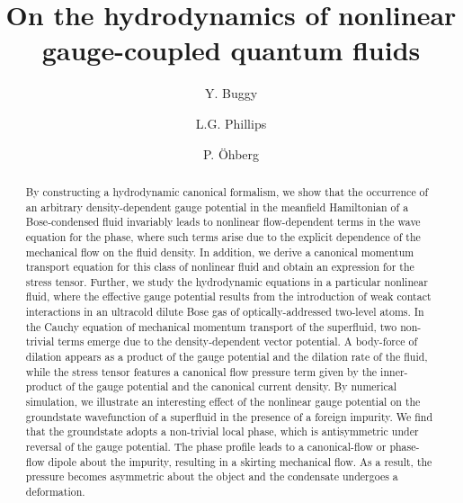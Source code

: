 \documentclass[twocolumn, nofootinbib, nobibnotes, amsmath,amssymb,aps, pra, floatfix]{revtex4-1}
\begin{document}

\title{On the hydrodynamics of nonlinear gauge-coupled quantum fluids}%

\author{Y. Buggy}
\author{L.G. Phillips}
 \author{P. {\"O}hberg}


\begin{abstract}
  By constructing a hydrodynamic canonical formalism, we show that the occurrence of an arbitrary density-dependent gauge potential in the meanfield Hamiltonian of a Bose-condensed fluid invariably leads to nonlinear flow-dependent terms in the wave equation for the phase, where such terms arise due to the explicit dependence of the mechanical flow on the fluid density.
  In addition, we derive a canonical momentum transport equation for this class of nonlinear fluid and obtain an expression for the stress tensor.
  Further, we study the hydrodynamic equations in a particular nonlinear fluid, where the effective gauge potential results from the introduction of weak contact interactions in an ultracold dilute Bose gas of optically-addressed two-level atoms.
  In the Cauchy equation of mechanical momentum transport of the superfluid, two non-trivial terms emerge due to the density-dependent vector potential. 
  A body-force of dilation appears as a product of the gauge potential and the dilation rate of the fluid, while the stress tensor features a canonical flow pressure term given by the inner-product of the gauge potential and the canonical current density.
  By numerical simulation, we illustrate an interesting effect of the nonlinear gauge potential on the groundstate wavefunction of a superfluid in the presence of a foreign impurity.
  We find that the groundstate adopts a non-trivial local phase, which is antisymmetric under reversal of the gauge potential.
  The phase profile leads to a canonical-flow or phase-flow dipole about the impurity, resulting in a skirting mechanical flow.
  As a result, the pressure becomes asymmetric about the object and the condensate undergoes a deformation.
\end{abstract}
\end{document}
